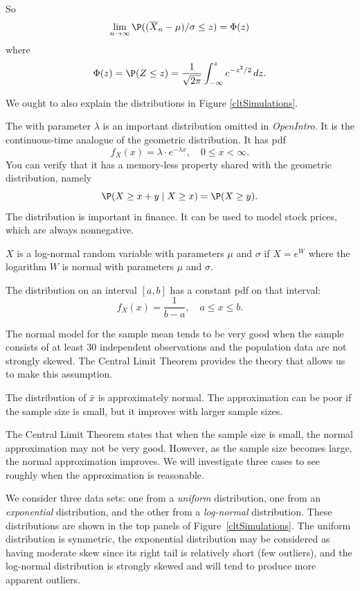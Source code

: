 So
\[
	\lim_{n\to\infty} \P((\overline X_n-\mu)/\sigma\le z) = \Phi(z)
\]
where
\[
	\Phi(z)=\P(Z\le z)=\frac1{\sqrt{2\pi}}\int_{-\infty}^z e^{-z^2/2}\,dz.
\]


We ought to also explain the distributions in Figure \ref{cltSimulations}.

The  with parameter $\lambda$ is an important distribution omitted in \emph{OpenIntro}. It is the continuous-time analogue of the geometric distribution. It has pdf
\[
	f_X(x)=\lambda\cdot e^{-\lambda x},\quad 0\le x<\infty.
\]
You can verify that it has a memory-less property shared with the geometric distribution, namely
\[
	\P(X\ge x+y\mid X\ge x) = \P(X\ge y).
\]
The  distribution is important in finance. It can be used to model stock prices, which are always nonnegative.
\begin{df}\label{lognormal}
$X$ is a log-normal random variable with parameters $\mu$ and $\sigma$ if $X=e^W$ where the logarithm $W$ is normal with parameters $\mu$ and $\sigma$.
\end{df}

The  distribution on an interval $[a,b]$ has a constant pdf on that interval:
\[
	f_X(x)=\frac1{b-a},\quad a\le x\le b.
\]

The normal model for the sample mean tends to be very good when the sample consists of at least 30 independent observations and the population data are not strongly skewed. The Central Limit Theorem provides the theory that allows us to make this assumption.

\begin{termBox}{
The distribution of $\bar{x}$ is approximately normal. The approximation can be poor if the sample size is small, but it improves with larger sample sizes.}
\end{termBox}

The Central Limit Theorem states that when the sample size is small, the normal approximation may not be very good. However, as the sample size becomes large, the normal approximation improves. We will investigate three cases to see roughly when the approximation is reasonable.

We consider three data sets: one from a \emph{uniform} distribution, one from an \emph{exponential} distribution, and the other from a \emph{log-normal} distribution. These distributions are shown in the top panels of Figure~\ref{cltSimulations}. The uniform distribution is symmetric, the exponential distribution may be considered as having moderate skew since its right tail is relatively short (few outliers), and the log-normal distribution is strongly skewed and will tend to produce more apparent outliers.

